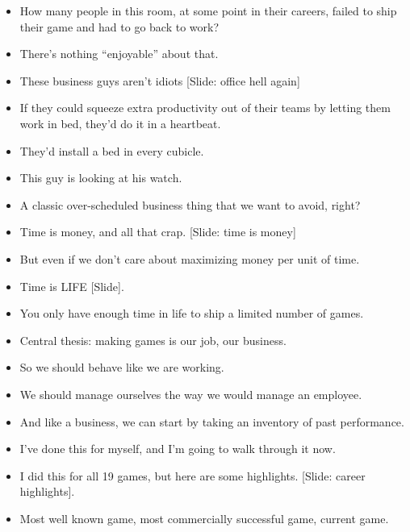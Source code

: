 \documentclass[12pt]{article}
\begin{document}
{\begin{itemize}
\item How many people in this room, at some point in their careers, failed to ship their game and had to go back to work?

\item There's nothing ``enjoyable'' about that.

\item These business guys aren't idiots [Slide: office hell again]

\item If they could squeeze extra productivity out of their teams by letting them work in bed, they'd do it in a heartbeat.

\item They'd install a bed in every cubicle.

\item This guy is looking at his watch.

\item A classic over-scheduled business thing that we want to avoid, right?

\item Time is money, and all that crap. [Slide: time is money]

\item But even if we don't care about maximizing money per unit of time.

\item Time is LIFE [Slide].

\item You only have enough time in life to ship a limited number of games.

\item Central thesis:  making games is our job, our business.

\item So we should behave like we are working.

\item We should manage ourselves the way we would manage an employee.

\item And like a business, we can start by taking an inventory of past performance.

\item I've done this for myself, and I'm going to walk through it now.

\item I did this for all 19 games, but here are some highlights. [Slide:  career highlights].

\item  Most well known game, most commercially successful game, current game.


\end{itemize}}
\end{document}
